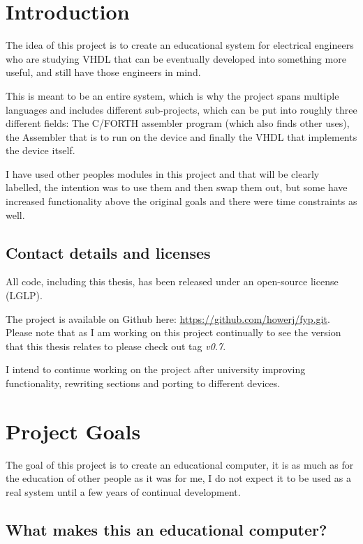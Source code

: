 \documentclass	[a4paper, 10pt]	{article}
\begin{document}
  \section{Introduction}

  The idea of this project is to create an educational system for electrical
  engineers who are studying VHDL that can be eventually developed into something 
  more useful, and still have those engineers in mind. 

  This is meant to be an entire system, which is why the project spans multiple
  languages and includes different sub-projects, which can be put into roughly
  three different fields: The C/FORTH assembler program (which also finds other
  uses), the Assembler that is to run on the device and finally the VHDL that implements
  the device itself.

  I have used other peoples modules in this project and that will be clearly labelled,
  the intention was to use them and then swap them out, but some have increased
  functionality above the original goals and there were time constraints as well.

  \subsection{Contact details and licenses}

  All code, including this thesis, has been released under an open-source
  license (LGLP).

  The project is available on Github here: \url{https://github.com/howerj/fyp.git}. Please
  note that as I am working on this project continually to see the version that this
  thesis relates to please check out tag \emph{v0.7}.

  I intend to continue working on the project after university improving functionality,
  rewriting sections and porting to different devices.

  \section{Project Goals}

  The goal of this project is to create an educational computer, it is as much as
  for the education of other people as it was for me, I do not expect it to be used
  as a real system until a few years of continual development.

    \subsection{What makes this an educational computer?}
\end{document}
